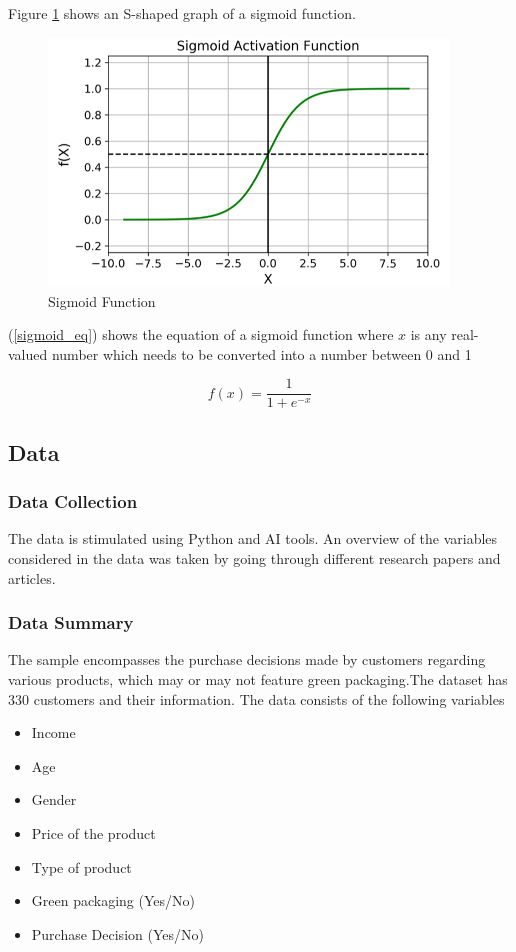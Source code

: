 \documentclass[a4paper,10pt]{article}
\begin{document}
Figure \ref{sigmoid} shows an S-shaped graph of a sigmoid function. 


\begin{figure}[ht]
\centering
\includegraphics[height=6.6cm]{figures/sigmoid.png}
\caption{Sigmoid Function}
\label{sigmoid}
\end{figure}

(\ref{sigmoid_eq}) shows the equation of a sigmoid function where $x$ is any real-valued number which needs to be converted into a number between 0 and 1

\begin{equation}
f(x) = \frac{1}{1 + e^{-x}}
\label{sigmoid_eq}
\end{equation}

\subsection{Data}
\subsubsection{Data Collection}

The data is stimulated using Python and AI tools. An overview of the variables considered in the data was taken by going through different research papers and articles. 

\subsubsection{Data Summary}
The sample encompasses the purchase decisions made by customers regarding various products, which may or may not feature green packaging.The dataset has 330 customers and their information. 
The data consists of the following variables
\begin{itemize}

    \item Income 
    \item Age 
    \item Gender 
    \item Price of the product
    \item Type of product
    \item Green packaging (Yes/No)
    \item Purchase Decision (Yes/No)
\end{itemize}
\end{document}
